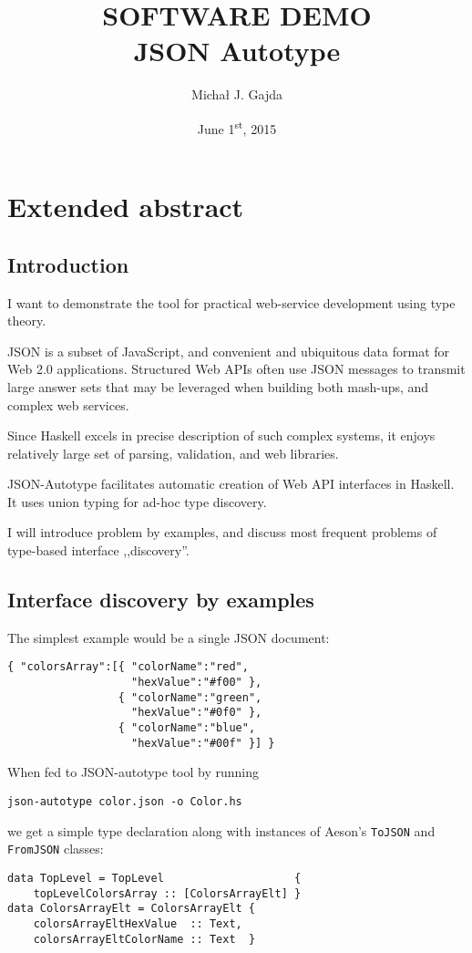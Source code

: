 \documentclass[11pt]{article}
\title{\textbf{{\large SOFTWARE DEMO}\\JSON Autotype\\
\vspace{5pt}{\large
Automatic bridge from untyped Web APIs
\\to typeful haven of Haskell}}}
\author{Micha\l{} J. Gajda}
\date{June 1\textsuperscript{st}, 2015}
\begin{document}
\maketitle

\section*{Extended abstract}
\subsection*{Introduction}
I want to demonstrate the tool for practical web-service development using type theory.

JSON is a subset of JavaScript, and convenient and ubiquitous data format for Web 2.0 applications. Structured Web APIs often use JSON messages to transmit large answer sets that may be leveraged when building both mash-ups, and complex web services.

Since Haskell excels in precise description of such complex systems, it enjoys relatively large set of parsing, validation, and web libraries.

JSON-Autotype facilitates automatic creation of Web API interfaces in Haskell. It uses union typing for ad-hoc type discovery.

I will introduce problem by examples, and discuss most frequent problems of type-based interface ,,discovery''.

\subsection*{Interface discovery by examples}

The simplest example would be a single JSON document:

\begin{verbatim}
{ "colorsArray":[{ "colorName":"red",
                   "hexValue":"#f00" },
                 { "colorName":"green",
                   "hexValue":"#0f0" },
                 { "colorName":"blue",
                   "hexValue":"#00f" }] }
\end{verbatim}

When fed to JSON-autotype tool by running \begin{verbatim}json-autotype color.json -o Color.hs\end{verbatim} we get a simple type declaration along with instances of Aeson's \texttt{ToJSON} and \texttt{FromJSON} classes:

\begin{verbatim}
data TopLevel = TopLevel                    {
    topLevelColorsArray :: [ColorsArrayElt] }
data ColorsArrayElt = ColorsArrayElt {
    colorsArrayEltHexValue  :: Text,
    colorsArrayEltColorName :: Text  }
\end{verbatim}
\end{document}
